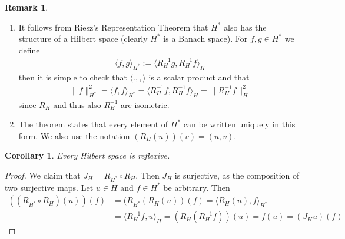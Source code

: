 \documentclass[11pt,a4paper]{article}
\newtheorem{cor}{Corollary}[section]
\theoremstyle{definition}
\newtheorem{rem}{Remark}[section]
\begin{document}
\begin{rem} \ \begin{enumerate}
\item It follows from Riesz's Representation Theorem that $H^*$ also has the structure of a Hilbert space (clearly $H^*$ is a Banach space). For $f,g \in H^*$ we define 
\begin{align*}
\langle f,g \rangle_{H^*} := \langle R_H^{-1} g, R_H^{-1} f \rangle_H
\end{align*}
then it is simple to check that $\langle . , , \rangle$ is a scalar product and that 
\begin{align*}
\|f\|_{H^*}^2 = \langle f,f \rangle_{H^*} = \langle R_H^{-1} f, R_H^{-1} f \rangle_H = \| R_H^{-1} f \|_H^2
\end{align*}
since $R_H$ and thus also $R_H^{-1}$ are isometric. 
\item The theorem states that every element of $H^*$ can be written uniquely in this form. We also use the notation $(R_H(u))(v)=(u,v)$. 
\end{enumerate} 
\end{rem}
\begin{cor} Every Hilbert space is reflexive.
\end{cor}
\begin{proof}
We claim that $J_H = R_{H^*} \circ R_H$. Then $J_H$ is surjective, as the composition of two surjective maps. Let $u \in H$ and $f \in H^*$ be arbitrary. Then 
\begin{align*}
((R_{H^*} \circ R_H)(u))(f)&= (R_{H^*}(R_H(u))(f)= \langle R_H(u),f \rangle_{H^*} \\
 & = \langle R_H^{-1}f, u \rangle_H = ( R_H(R_H^{-1} f))(u)=f(u)=(J_Hu)(f)
\end{align*}
\end{proof}
\end{document}
